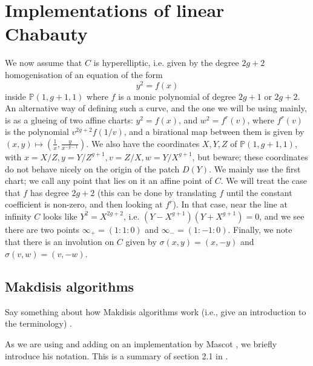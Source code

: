 \documentclass[12pt]{article}
\renewcommand{\P}{\mathbb{P}}
\theoremstyle{plain}
\theoremstyle{definition}
\theoremstyle{remark}
\begin{document}
\section{Implementations of linear Chabauty}
\label{section:explicit}
We now assume that $C$ is hyperelliptic, i.e. given by the degree $2g+2$ homogenisation of an equation of the form
\[
y^2 = f(x)
\]
inside $\P(1,g+1,1)$ where $f$ is a monic polynomial of degree $2g+1$ or $2g+2$. An alternative way of defining such a curve, and the one we will be using mainly, is as a glueing of two affine charts: $y^2 = f(x)$, and $w^2 = f^{r}(v)$, where $f^{r}(v)$ is the polynomial $v^{2g + 2} f(1/v)$, and a birational map between them is given by $(x,y) \mapsto (\frac{1}{x},\frac{y}{x^{-g-1}})$. We also have the coordinates $X,Y,Z$ of $\P(1,g+1,1)$, with $x = X/Z, y = Y/Z^{g+1}, v = Z/X, w = Y/X^{g+1}$, but beware; these coordinates do not behave nicely on the origin of the patch $D(Y)$. We mainly use the first chart; we call any point that lies on it an affine point of $C$. We will treat the case that $f$ has degree $2g+2$ (this can be done by translating $f$ until the constant coefficient is non-zero, and then looking at $f^r$). In that case, near the line at infinity $C$ looks like $Y^2 = X^{2g+2}$, i.e. $(Y-X^{g+1})(Y+X^{g+1}) = 0$, and we see there are two points $\infty_+ = (1:1:0)$ and $\infty_- = (1:-1:0)$. Finally, we note that there is an involution on $C$ given by $\sigma(x,y) = (x,-y)$ and $\sigma(v,w) = (v,-w)$.

\subsection{Makdisis algorithms}
Say something about how Makdisis algorithms work (i.e., give an introduction to the terminology) \cite{makdisi04}.

As we are using and adding on an implementation by Mascot \cite{mascot2018}, we briefly introduce his notation. This is a summary of section 2.1 in \cite{mascot2018}.
\end{document}
